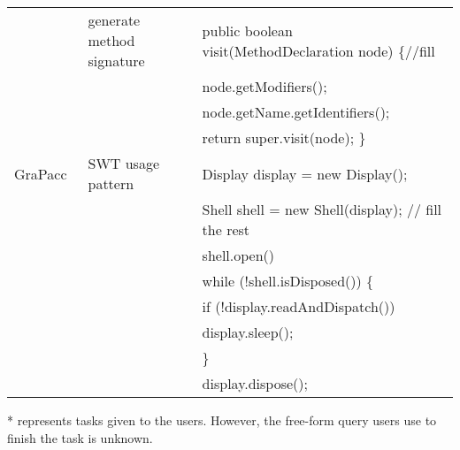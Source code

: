 \begin{table*}[ht]
\begin{center}
{\begin{tabular*}{1\textwidth}{@{}l|l|l@{}}
&generate method signature&public boolean visit(MethodDeclaration node) \{//fill\\
&& node.getModifiers();\\
&& node.getName.getIdentifiers();\\
&& return super.visit(node); \} \\ \hline
 GraPacc~\cite{Nguyen:GraPaccICSE12}&SWT usage pattern&Display display = new Display();\\
 && Shell shell = new Shell(display); // fill the rest\\
 && shell.open()\\
 && while (!shell.isDisposed()) \{\\
 &&  if (!display.readAndDispatch())\\
 &&   display.sleep();\\
 && \}\\
 && display.dispose();\\ \hline
 
\end{tabular*}
 \label{tab:concern}
 
* represents tasks given to the users. However, the free-form query users use to finish the task is unknown.
}

 \end{center}
\end{table*}


